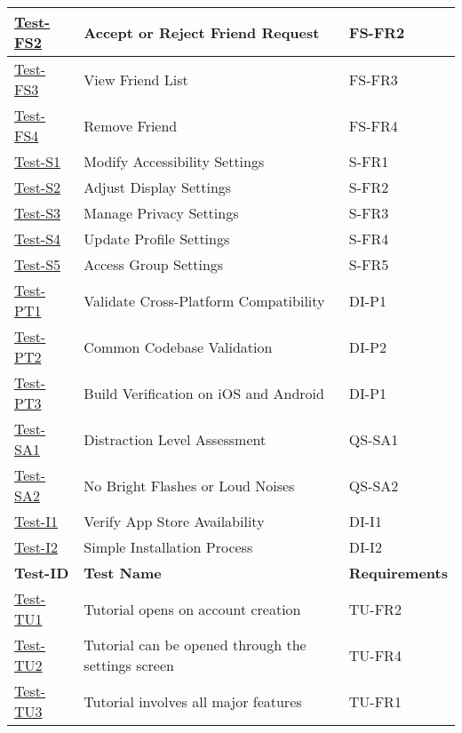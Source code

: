 \documentclass[12pt, titlepage]{article}
\begin{document}
\begin{enumerate}
\begin{table}[h!]
\begin{tabular}{|l|l|l|}
        \hline
        \hyperref[itm:Test-FS2]{Test-FS2} & Accept or Reject Friend Request & FS-FR2 \\
        \hline
        \hyperref[itm:Test-FS3]{Test-FS3} & View Friend List & FS-FR3 \\
        \hline
        \hyperref[itm:Test-FS4]{Test-FS4} & Remove Friend & FS-FR4 \\
        \hline
        \hyperref[itm:Test-S1]{Test-S1} & Modify Accessibility Settings & S-FR1 \\
        \hline
        \hyperref[itm:Test-S2]{Test-S2} & Adjust Display Settings & S-FR2 \\
        \hline
        \hyperref[itm:Test-S3]{Test-S3} & Manage Privacy Settings & S-FR3 \\
        \hline
        \hyperref[itm:Test-S4]{Test-S4} & Update Profile Settings & S-FR4 \\
        \hline
        \hyperref[itm:Test-S5]{Test-S5} & Access Group Settings & S-FR5 \\
        \hline
        \hyperref[itm:Test-PT1]{Test-PT1} & Validate Cross-Platform Compatibility & DI-P1 \\
        \hline
        \hyperref[itm:Test-PT2]{Test-PT2} & Common Codebase Validation & DI-P2 \\
        \hline
        \hyperref[itm:Test-PT3]{Test-PT3} & Build Verification on iOS and Android & DI-P1\\
        \hline
        \hyperref[itm:Test-SA1]{Test-SA1} & Distraction Level Assessment & QS-SA1 \\
        \hline
        \hyperref[itm:Test-SA2]{Test-SA2} & No Bright Flashes or Loud Noises & QS-SA2 \\
        \hline
        \hyperref[itm:Test-I1]{Test-I1} & Verify App Store Availability & DI-I1 \\
        \hline
        \hyperref[itm:Test-I2]{Test-I2} & Simple Installation Process & DI-I2 \\
        \hline
        \textbf{Test-ID} & \textbf{Test Name} &\textbf{Requirements} \\
        \hline
        \hyperref[itm:Test-TU1]{Test-TU1} & Tutorial opens on account creation & TU-FR2 \\
        \hline
        \hyperref[itm:Test-TU2]{Test-TU2} & Tutorial can be opened through the settings screen & TU-FR4 \\
        \hline
        \hyperref[itm:Test-TU3]{Test-TU3} & Tutorial involves all major features & TU-FR1 \\

\end{tabular}
\end{table}
\end{enumerate}
\end{document}
